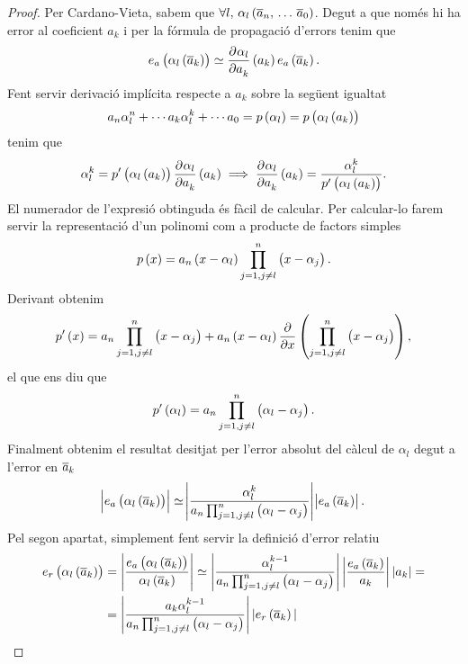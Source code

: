 \begin{proof}
  Per Cardano-Vieta, sabem que $\forall l,\, \alpha_l\left(\overline{a}_n,\,\dots\,\overline{a}_0\right)$. Degut a que només hi ha error al coeficient $a_k$ i per la fórmula de propagació d'errors tenim que
  \[
    e_a\left( \alpha_l\left( \overline{a}_k\right) \right)  \simeq \frac{\partial^{} \alpha_l}{\partial a_k^{}}\left( a_k\right) e_a\left( \overline{a}_k\right) .
  \]
  Fent servir derivació implícita respecte a $a_k$ sobre la següent igualtat
  \[
     a_n\alpha_l^n + \cdots a_k\alpha_l^k + \cdots a_0 = p\left( \alpha_l\right)  = p\left( \alpha_l\left( a_k\right) \right) 
  \]
  tenim que
  \[
    \alpha_l^k = p'\left( \alpha_l\left( a_k\right) \right) \frac{\partial^{} \alpha_l}{\partial a_k^{}}\left( a_k\right)  \implies \frac{\partial^{} \alpha_l}{\partial a_k^{}}\left( a_k\right)  = \dfrac{\alpha_l^k}{p'\left( \alpha_l\left( a_k\right) \right)}.
  \]
  El numerador de l'expresió obtinguda és fàcil de calcular. Per calcular-lo farem servir la representació d'un polinomi com a producte de factors simples
  \[
      p\left( x\right) = a_n\left( x-\alpha_l\right) \prod_{j=1,j\neq l}^{n}\left( x-\alpha_j\right).
  \]
  Derivant obtenim
  \[
    p'\left( x\right)  = a_n\prod_{j=1,j\neq l}^{n}\left( x-\alpha_j\right)  + a_n\left( x-\alpha_l\right) \frac{\partial}{\partial x}\left( \prod_{j=1,j\neq l}^{n}\left( x-\alpha_j\right)\right),
  \]
  el que ens diu que
  \[
    p'\left( \alpha_l\right) = a_n\prod_{j=1,j\neq l}^{n}\left( \alpha_l-\alpha_j\right).
  \]
  Finalment obtenim el resultat desitjat per l'error absolut del càlcul de $\alpha_l$ degut a l'error en $\overline{a}_k$
  \[
    \abs{e_a\left( \alpha_l\left( \overline{a}_k\right) \right)} \simeq \abs{\frac{\alpha_l^k}{ a_n\prod_{j=1,j\neq l}^{n}\left( \alpha_l-\alpha_j\right) }}\abs{e_a\left( \overline{a}_k\right)}.
  \]
  Pel segon apartat, simplement fent servir la definició d'error relatiu 
  \begin{align*}
    e_r\left( \alpha_l\left( \overline{a}_k\right) \right) & = \left|\frac{e_a\left( \alpha_l\left( \overline{a}_k\right) \right) }{\alpha_l\left( \overline{a}_k\right) }\right| \simeq \left|\frac{\alpha_l^{k-1}}{ a_n\prod_{j=1,j\neq l}^{n}\left( \alpha_l-\alpha_j\right) }\right|\left|\frac{e_a\left( \overline{a}_k\right) }{a_k}\right||a_k|=\\
           & = \left|\frac{a_k\alpha_l^{k-1}}{a_n\prod_{j=1,j\neq l}^{n}\left( \alpha_l-\alpha_j\right) }\right| |e_r\left( \overline{a}_k\right) |
  \end{align*}
\end{proof}

